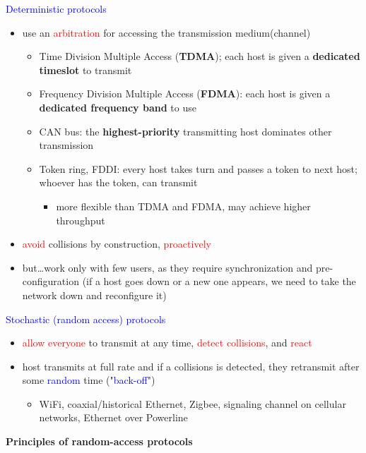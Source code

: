 \documentclass[11pt]{article}
\begin{document}
\textcolor{blue}{Deterministic protocols}
\begin{itemize}
	\item use an \textcolor{red}{arbitration} for accessing the transmission medium(channel)
	\begin{itemize}
		\item Time Division Multiple Access (\textbf{TDMA}); each host is given a \textbf{dedicated timeslot} to transmit
	\item Frequency Division Multiple Access (\textbf{FDMA}): each host is given a \textbf{dedicated frequency band} to use
	\item CAN bus: the \textbf{highest-priority} transmitting host dominates other transmission
	\item Token ring, FDDI: every host takes turn and passes a token to next host; whoever has the token, can transmit
		\begin{itemize}
			\item more flexible than TDMA and FDMA, may achieve higher throughput
		\end{itemize}
 	\end{itemize}
	\item \textcolor{red}{avoid} collisions by construction, \textcolor{red}{proactively}
	\item but…work only with few users, as they require synchronization and pre-configuration (if a host goes down or a new one appears, we need to take the network down and reconfigure it)
\end{itemize}

\textcolor{blue}{Stochastic (random access) protocols}
\begin{itemize}
	\item \textcolor{red}{allow everyone} to transmit at any time, \textcolor{red}{detect collisions}, and \textcolor{red}{react}
	\item host transmits at full rate and if a collisions is detected, they retransmit after some \textcolor{blue}{random} time ("\textcolor{blue}{back-off}") 
		\begin{itemize}
			\item WiFi, coaxial/historical Ethernet, Zigbee, signaling channel on cellular networks, Ethernet over Powerline
		\end{itemize}
\end{itemize}

\newpage

\begin{center}
  {\LARGE \textbf{Principles of random-access protocols}}
\end{center}
\end{document}
